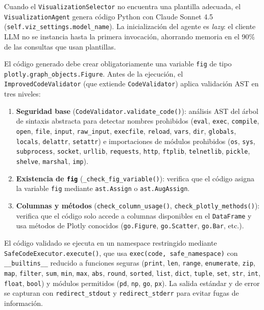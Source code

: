 Cuando el \texttt{VisualizationSelector} no encuentra una plantilla adecuada, el \texttt{VisualizationAgent} genera código Python con Claude Sonnet 4.5 (\texttt{self.viz\_settings.model\_name}). La inicialización del agente es \textit{lazy}: el cliente LLM no se instancia hasta la primera invocación, ahorrando memoria en el 90\% de las consultas que usan plantillas.

El código generado debe crear obligatoriamente una variable \texttt{fig} de tipo \texttt{plotly.graph\_objects.Figure}. Antes de la ejecución, el \texttt{ImprovedCodeValidator} (que extiende \texttt{CodeValidator}) aplica validación AST en tres niveles:

\begin{enumerate}[nosep, leftmargin=*]
  \item \textbf{Seguridad base} (\texttt{CodeValidator.validate\_code()}): análisis AST del árbol de sintaxis abstracta para detectar nombres prohibidos (\texttt{eval}, \texttt{exec}, \texttt{compile}, \texttt{open}, \texttt{file}, \texttt{input}, \texttt{raw\_input}, \texttt{execfile}, \texttt{reload}, \texttt{vars}, \texttt{dir}, \texttt{globals}, \texttt{locals}, \texttt{delattr}, \texttt{setattr}) e importaciones de módulos prohibidos (\texttt{os}, \texttt{sys}, \texttt{subprocess}, \texttt{socket}, \texttt{urllib}, \texttt{requests}, \texttt{http}, \texttt{ftplib}, \texttt{telnetlib}, \texttt{pickle}, \texttt{shelve}, \texttt{marshal}, \texttt{imp}).
  \item \textbf{Existencia de \texttt{fig}} (\texttt{\_check\_fig\_variable()}): verifica que el código asigna la variable \texttt{fig} mediante \texttt{ast.Assign} o \texttt{ast.AugAssign}.
  \item \textbf{Columnas y métodos} (\texttt{check\_column\_usage()}, \texttt{check\_plotly\_methods()}): verifica que el código solo accede a columnas disponibles en el \texttt{DataFrame} y usa métodos de Plotly conocidos (\texttt{go.Figure}, \texttt{go.Scatter}, \texttt{go.Bar}, etc.).
\end{enumerate}

El código validado se ejecuta en un namespace restringido mediante \texttt{SafeCodeExecutor.execute()}, que usa \texttt{exec(code, safe\_namespace)} con \texttt{\_\_builtins\_\_} reducido a funciones seguras (\texttt{print}, \texttt{len}, \texttt{range}, \texttt{enumerate}, \texttt{zip}, \texttt{map}, \texttt{filter}, \texttt{sum}, \texttt{min}, \texttt{max}, \texttt{abs}, \texttt{round}, \texttt{sorted}, \texttt{list}, \texttt{dict}, \texttt{tuple}, \texttt{set}, \texttt{str}, \texttt{int}, \texttt{float}, \texttt{bool}) y módulos permitidos (\texttt{pd}, \texttt{np}, \texttt{go}, \texttt{px}). La salida estándar y de error se capturan con \texttt{redirect\_stdout} y \texttt{redirect\_stderr} para evitar fugas de información.


